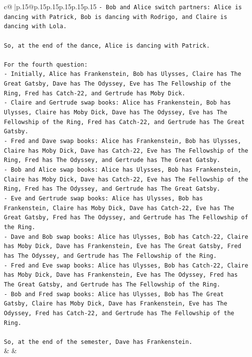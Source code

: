 \documentclass{article}
\begin{document}
{\begin{supertabular}{c@{$\;$}|p{.15\linewidth}@{}p{.15\linewidth}p{.15\linewidth}p{.15\linewidth}p{.15\linewidth}p{.15\linewidth}}
{{{\texttt{{-} Bob and Alice switch partners: Alice is dancing with Patrick, Bob is dancing with Rodrigo, and Claire is dancing with Lola.} \\
\\ 
\texttt{So, at the end of the dance, Alice is dancing with Patrick.} \\
\\ 
\texttt{For the fourth question:} \\
\texttt{{-} Initially, Alice has Frankenstein, Bob has Ulysses, Claire has The Great Gatsby, Dave has The Odyssey, Eve has The Fellowship of the Ring, Fred has Catch{-}22, and Gertrude has Moby Dick.} \\
\texttt{{-} Claire and Gertrude swap books: Alice has Frankenstein, Bob has Ulysses, Claire has Moby Dick, Dave has The Odyssey, Eve has The Fellowship of the Ring, Fred has Catch{-}22, and Gertrude has The Great Gatsby.} \\
\texttt{{-} Fred and Dave swap books: Alice has Frankenstein, Bob has Ulysses, Claire has Moby Dick, Dave has Catch{-}22, Eve has The Fellowship of the Ring, Fred has The Odyssey, and Gertrude has The Great Gatsby.} \\
\texttt{{-} Bob and Alice swap books: Alice has Ulysses, Bob has Frankenstein, Claire has Moby Dick, Dave has Catch{-}22, Eve has The Fellowship of the Ring, Fred has The Odyssey, and Gertrude has The Great Gatsby.} \\
\texttt{{-} Eve and Gertrude swap books: Alice has Ulysses, Bob has Frankenstein, Claire has Moby Dick, Dave has Catch{-}22, Eve has The Great Gatsby, Fred has The Odyssey, and Gertrude has The Fellowship of the Ring.} \\
\texttt{{-} Dave and Bob swap books: Alice has Ulysses, Bob has Catch{-}22, Claire has Moby Dick, Dave has Frankenstein, Eve has The Great Gatsby, Fred has The Odyssey, and Gertrude has The Fellowship of the Ring.} \\
\texttt{{-} Fred and Eve swap books: Alice has Ulysses, Bob has Catch{-}22, Claire has Moby Dick, Dave has Frankenstein, Eve has The Odyssey, Fred has The Great Gatsby, and Gertrude has The Fellowship of the Ring.} \\
\texttt{{-} Bob and Fred swap books: Alice has Ulysses, Bob has The Great Gatsby, Claire has Moby Dick, Dave has Frankenstein, Eve has The Odyssey, Fred has Catch{-}22, and Gertrude has The Fellowship of the Ring.} \\
\\ 
\texttt{So, at the end of the semester, Dave has Frankenstein.} \\
            }
        }
    }
    & & \\ \\


\end{supertabular}}
\end{document}
